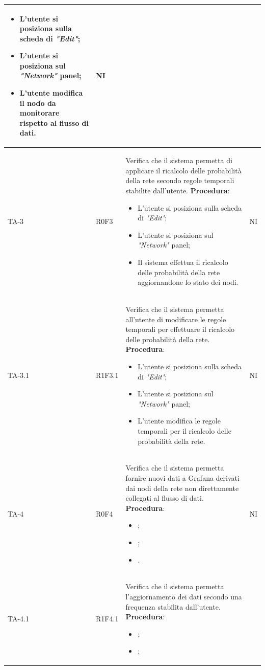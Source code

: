 \begin{longtable}{|C{2.5cm}|C{2.5cm}|L{6.5cm}|C{1.5cm}|}
\begin{itemize}
		\item L'utente si posiziona sulla scheda di \emph{"Edit"};
		\item L'utente si posiziona sul \emph{"Network"} panel;
		\item L'utente modifica il nodo da monitorare rispetto al flusso di dati.
	\end{itemize}
	 & {NI}\\
	\hline
	{TA-3} & {R0F3} & 
	Verifica che il sistema permetta di applicare il
	ricalcolo delle probabilità della rete
	secondo regole temporali stabilite dall'utente.
	\textbf{Procedura}:
	\begin{itemize}		
		\item L'utente si posiziona sulla scheda di \emph{"Edit"};
		\item L'utente si posiziona sul \emph{"Network"} panel;
		\item Il sistema effettua il ricalcolo delle probabilità della rete aggiornandone lo stato dei nodi.
	\end{itemize}	
	 & {NI}\\
	\hline
	{TA-3.1} & {R1F3.1} & 
	Verifica che il sistema permetta all'utente di modificare le regole temporali per effettuare il ricalcolo delle probabilità della rete.
	\textbf{Procedura}:
	\begin{itemize}		
		\item L'utente si posiziona sulla scheda di \emph{"Edit"};
		\item L'utente si posiziona sul \emph{"Network"} panel;
		\item L'utente modifica le regole temporali per il ricalcolo delle probabilità della rete.
	\end{itemize}
	 & {NI}\\
	\hline
	{TA-4} & {R0F4} & 
	Verifica che il sistema permetta fornire nuovi dati a Grafana derivati dai nodi
	della rete non direttamente collegati al flusso di
	dati.
	\textbf{Procedura}:
	\begin{itemize}		
		\item ;
		\item ;
		\item .
	\end{itemize}
	 & {NI}\\
	\hline
	{TA-4.1} & {R1F4.1} & 
	Verifica che il sistema permetta l'aggiornamento dei dati secondo una frequenza stabilita dall'utente.
	\textbf{Procedura}:
	\begin{itemize}		
		\item ;
		\item ;

\end{itemize}
\end{longtable}
